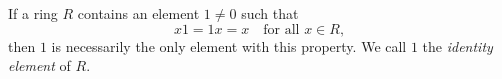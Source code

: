 If a ring $R$ contains an element $1 \neq 0$ such that
$$x1 = 1x = x \quad \text{for all } x \in R,$$
then $1$ is necessarily the only element with this property. We call $1$ the \emph{identity element} of $R$.
